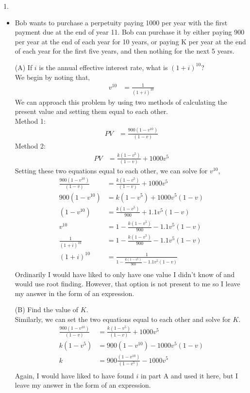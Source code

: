 \documentclass[12pt]{article}
\begin{document}
1. 
\begin{itemize}
    \item Bob wants to purchase a perpetuity paying 1000 per year with the first payment due at the end of year 11. Bob can purchase it by either paying 900 per year at the end of each year for 10 years, or paying K per year at the end of each year for the first five years, and then nothing for the next 5 years. 
    
    (A) If $i$ is the annual effective interest rate, what is $(1+i)^{10}$?\\
    We begin by noting that,\\
    \begin{align*}
	    v^{10}&= \frac{1}{(1+i)^{10}}
    \end{align*}
    We can approach this problem by using two methods of calculating the present value and setting them equal to each other.\\
    
    Method 1:\\
    \begin{align*}
	    PV &= \frac{900(1-v^{10})}{(1-v)}
    \end{align*}
    Method 2:\\
    \begin{align*}
	    PV &= \frac{k(1-v^5)}{(1-v)}+1000v^5
    \end{align*}
    Setting these two equations equal to each other, we can solve for $v^{10}$,\\
    \begin{align*}
        \frac{900(1-v^{10})}{(1-v)} &= \frac{k(1-v^5)}{(1-v)}+1000v^5\\
	900(1-v^{10}) &= k(1-v^5)+1000v^5(1-v)\\
	(1-v^{10}) &= \frac{k(1-v^5)}{900}+1.1v^5(1-v)\\
	v^{10} &= 1-\frac{k(1-v^5)}{900}-1.1v^5(1-v)\\
	\frac{1}{(1+i)^{10}} &= 1-\frac{k(1-v^5)}{900}-1.1v^5(1-v)\\
	(1+i)^{10} &= \frac{1}{1-\frac{k(1-v^5)}{900}-1.1v^5(1-v)}\\
    \end{align*}
    Ordinarily I would have liked to only have one value I didn't know of and would use root finding. However,
    that option is not present to me so I leave my answer in the form of an expression.
    
    (B) Find the value of $K$.\\
    Similarly, we can set the two equations equal to each other and solve for $K$.\\
    \begin{align*}
	\frac{900(1-v^{10})}{(1-v)} &= \frac{k(1-v^5)}{(1-v)}+1000v^5\\
	k(1-v^5) &= 900(1-v^{10})-1000v^5(1-v)\\
	k&= 900\frac{(1-v^{10})}{(1-v^5)}-1000v^5\\
    \end{align*}
    Again, I would have liked to have found $i$ in part A and used it here, but I leave my answer in the form of an expression.
    
\end{itemize}
\end{document}
